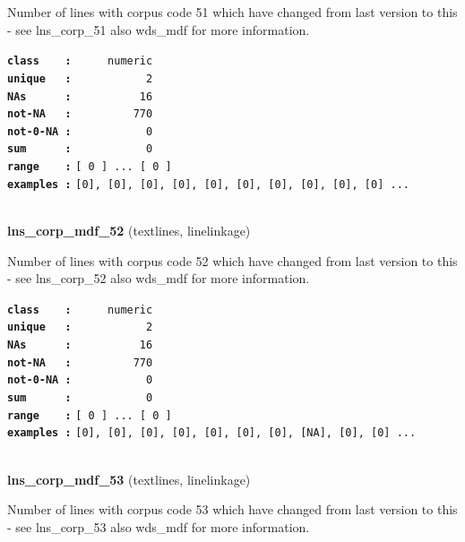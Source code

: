 \documentclass[]{article}
\begin{document}
Number of lines with corpus code 51 which have changed from last version
to this - see lns\_corp\_51 also wds\_mdf for more information.

\textbf{\texttt{class\ \ \ \ :}} \texttt{~~~~~numeric}\\
\textbf{\texttt{unique\ \ \ :}} \texttt{~~~~~~~~~~~2}\\
\textbf{\texttt{NAs\ \ \ \ \ \ :}} \texttt{~~~~~~~~~~16}\\
\textbf{\texttt{not-NA\ \ \ :}} \texttt{~~~~~~~~~770}\\
\textbf{\texttt{not-0-NA\ :}} \texttt{~~~~~~~~~~~0}\\
\textbf{\texttt{sum\ \ \ \ \ \ :}} \texttt{~~~~~~~~~~~0}\\
\textbf{\texttt{range\ \ \ \ :}}
\texttt{{[}\ 0\ {]}\ ...\ {[}\ 0\ {]}}\\
\textbf{\texttt{examples\ :}}
\texttt{{[}0{]},\ {[}0{]},\ {[}0{]},\ {[}0{]},\ {[}0{]},\ {[}0{]},\ {[}0{]},\ {[}0{]},\ {[}0{]},\ {[}0{]}\ ...}\\

~

\textbf{lns\_corp\_mdf\_52} (textlines, linelinkage)

Number of lines with corpus code 52 which have changed from last version
to this - see lns\_corp\_52 also wds\_mdf for more information.

\textbf{\texttt{class\ \ \ \ :}} \texttt{~~~~~numeric}\\
\textbf{\texttt{unique\ \ \ :}} \texttt{~~~~~~~~~~~2}\\
\textbf{\texttt{NAs\ \ \ \ \ \ :}} \texttt{~~~~~~~~~~16}\\
\textbf{\texttt{not-NA\ \ \ :}} \texttt{~~~~~~~~~770}\\
\textbf{\texttt{not-0-NA\ :}} \texttt{~~~~~~~~~~~0}\\
\textbf{\texttt{sum\ \ \ \ \ \ :}} \texttt{~~~~~~~~~~~0}\\
\textbf{\texttt{range\ \ \ \ :}}
\texttt{{[}\ 0\ {]}\ ...\ {[}\ 0\ {]}}\\
\textbf{\texttt{examples\ :}}
\texttt{{[}0{]},\ {[}0{]},\ {[}0{]},\ {[}0{]},\ {[}0{]},\ {[}0{]},\ {[}0{]},\ {[}NA{]},\ {[}0{]},\ {[}0{]}\ ...}\\

~

\textbf{lns\_corp\_mdf\_53} (textlines, linelinkage)

Number of lines with corpus code 53 which have changed from last version
to this - see lns\_corp\_53 also wds\_mdf for more information.
\end{document}
